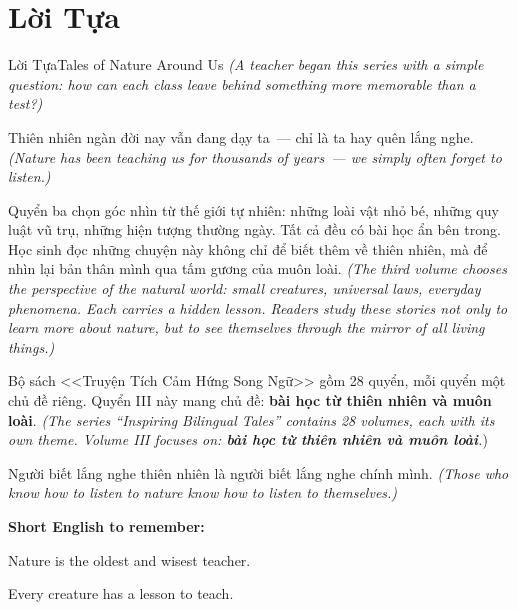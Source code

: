 \chapter*{Lời Tựa}

\begin{truyen}{Lời Tựa}{Tales of Nature Around Us}
\textit{(A teacher began this series with a simple question: how can each class leave behind something more memorable than a test?)}

Thiên nhiên ngàn đời nay vẫn đang dạy ta~--- chỉ là ta hay quên lắng nghe.
\textit{(Nature has been teaching us for thousands of years~--- we simply often forget to listen.)}

Quyển ba chọn góc nhìn từ thế giới tự nhiên: những loài vật nhỏ bé, những quy luật vũ trụ, những hiện tượng thường ngày. Tất cả đều có bài học ẩn bên trong. Học sinh đọc những chuyện này không chỉ để biết thêm về thiên nhiên, mà để nhìn lại bản thân mình qua tấm gương của muôn loài.
\textit{(The third volume chooses the perspective of the natural world: small creatures, universal laws, everyday phenomena. Each carries a hidden lesson. Readers study these stories not only to learn more about nature, but to see themselves through the mirror of all living things.)}

Bộ sách <<Truyện Tích Cảm Hứng Song Ngữ>> gồm 28 quyển, mỗi quyển một chủ đề riêng. Quyển III này mang chủ đề: \textbf{bài học từ thiên nhiên và muôn loài}.
\textit{(The series ``Inspiring Bilingual Tales'' contains 28 volumes, each with its own theme. Volume III focuses on: \textbf{bài học từ thiên nhiên và muôn loài}.})
\end{truyen}

\begin{baihoc}
Người biết lắng nghe thiên nhiên là người biết lắng nghe chính mình.
\textit{(Those who know how to listen to nature know how to listen to themselves.)}
\end{baihoc}

\begin{tcolorbox}[
  colback=truyenblue!6, colframe=truyenblue,
  coltitle=white, fonttitle=\bfseries,
  title={Easy English},
  arc=4pt, boxrule=1pt, breakable, enhanced
]
\textbf{Short English to remember:}

Nature is the oldest and wisest teacher.

Every creature has a lesson to teach.
\end{tcolorbox}

